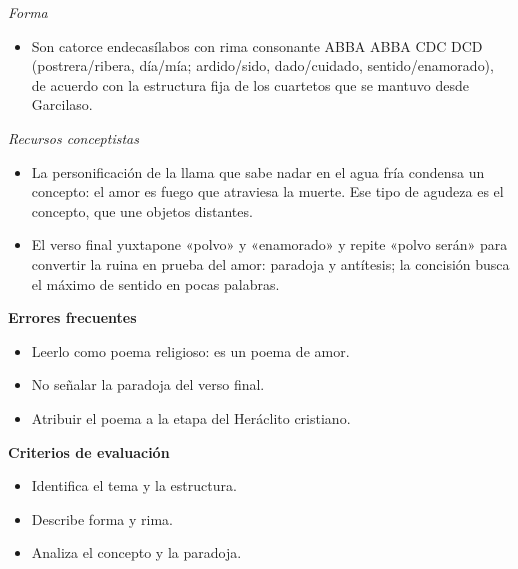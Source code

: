 \documentclass{book}
\begin{document}
\begin{tcolorbox}[title={Ejercicio resuelto}, studiumworked, breakable]
\noindent\textit{Forma}
\begin{itemize}
\item Son catorce endecasílabos con rima consonante ABBA ABBA CDC DCD (postrera/ribera, día/mía; ardido/sido, dado/cuidado, sentido/enamorado), de acuerdo con la estructura fija de los cuartetos que se mantuvo desde Garcilaso.
\end{itemize}

\noindent\textit{Recursos conceptistas}
\begin{itemize}
\item La personificación de la llama que sabe nadar en el agua fría condensa un concepto: el amor es fuego que atraviesa la muerte. Ese tipo de agudeza es el concepto, que une objetos distantes.
\item El verso final yuxtapone «polvo» y «enamorado» y repite «polvo serán» para convertir la ruina en prueba del amor: paradoja y antítesis; la concisión busca el máximo de sentido en pocas palabras.
\end{itemize}

\noindent\textbf{Errores frecuentes}
\begin{itemize}
\item Leerlo como poema religioso: es un poema de amor.
\item No señalar la paradoja del verso final.
\item Atribuir el poema a la etapa del Heráclito cristiano.
\end{itemize}

\noindent\textbf{Criterios de evaluación}
\begin{itemize}
\item Identifica el tema y la estructura.
\item Describe forma y rima.
\item Analiza el concepto y la paradoja.
\end{itemize}
\end{tcolorbox}
\end{document}
